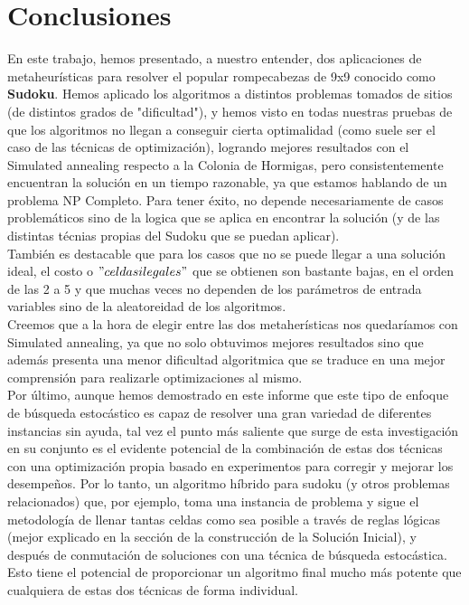 \section{Conclusiones}

En este trabajo, hemos presentado, a nuestro entender, dos aplicaciones de metaheurísticas para resolver el popular rompecabezas de 9x9 conocido como \textbf{Sudoku}. Hemos aplicado los algoritmos a distintos problemas tomados de sitios (de distintos grados de "dificultad"), y hemos visto en todas nuestras pruebas de que los algoritmos no llegan a conseguir cierta optimalidad (como suele ser el caso de las técnicas de optimización), logrando mejores resultados con el Simulated annealing respecto a la Colonia de Hormigas, pero consistentemente encuentran la solución en un tiempo razonable, ya que estamos hablando de un problema NP Completo. Para tener éxito, no depende necesariamente de casos problemáticos sino de la logica que se aplica en encontrar la solución (y de las distintas técnias propias del Sudoku que se puedan aplicar).\\
También es destacable que para los casos que no se puede llegar a una solución ideal, el costo o $"celdas ilegales"$ que se obtienen son bastante bajas, en el orden de las 2 a 5 y que muchas veces no dependen de los parámetros de entrada variables sino de la aleatoreidad de los algoritmos. \\
Creemos que a la hora de elegir entre las dos metaherísticas nos quedaríamos con Simulated annealing, ya que no solo obtuvimos mejores resultados sino que además presenta una menor dificultad algoritmica que se traduce en una mejor comprensión para realizarle optimizaciones al mismo. \\
Por último, aunque hemos demostrado en este informe que este tipo de enfoque de búsqueda estocástico es capaz de resolver una gran variedad de diferentes instancias sin ayuda, tal vez el punto más saliente que surge de esta investigación en su conjunto es el evidente potencial de la combinación de estas dos técnicas con una optimización propia basado en experimentos para corregir y mejorar los desempeños.  Por lo tanto, un algoritmo híbrido para sudoku (y otros problemas relacionados) que, por ejemplo, toma una instancia de problema y sigue el metodología de  llenar tantas celdas como sea posible a través de reglas lógicas (mejor explicado en la sección de la construcción de la Solución Inicial), y después de conmutación de soluciones con una técnica de búsqueda estocástica. Esto tiene el potencial de proporcionar un algoritmo final mucho más potente que cualquiera de estas dos técnicas de forma individual. 

